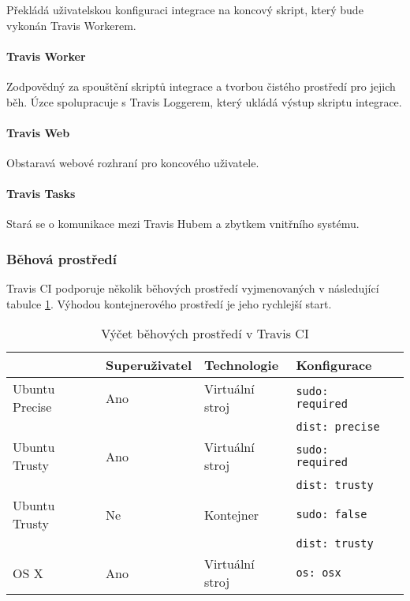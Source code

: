 Překládá uživatelskou konfiguraci integrace na koncový skript, který bude vykonán Travis Workerem.

\paragraph{Travis Worker}

Zodpovědný za spouštění skriptů integrace a tvorbou čistého prostředí pro jejich běh.
Úzce spolupracuje s Travis Loggerem, který ukládá výstup skriptu integrace.

\paragraph{Travis Web}

Obstaravá webové rozhraní pro koncového uživatele.

\paragraph{Travis Tasks}

Stará se o komunikace mezi Travis Hubem a zbytkem vnitřního systému.

\subsubsection{Běhová prostředí}

Travis CI podporuje několik běhových prostředí vyjmenovaných v následující tabulce \ref{table:travis-env}.
Výhodou kontejnerového prostředí je jeho rychlejší start.

\begin{table}[ht]
\centering
\caption{Výčet běhových prostředí v Travis CI}
\label{table:travis-env}
\begin{tabular}{|l|l|l|l|l|}
\hline
& Superuživatel & Technologie & Konfigurace  \\ \hline
Ubuntu Precise & Ano & Virtuální stroj & \verb|sudo: required| \\ 
& & & \verb|dist: precise|  \\ \hline
Ubuntu Trusty & Ano & Virtuální stroj & \verb|sudo: required| \\
& & & \verb|dist: trusty| \\ \hline
Ubuntu Trusty & Ne & Kontejner & \verb|sudo: false|  \\
& & & \verb|dist: trusty| \\ \hline
OS X & Ano & Virtuální stroj & \verb|os: osx|  \\ \hline
\end{tabular}
\end{table}

